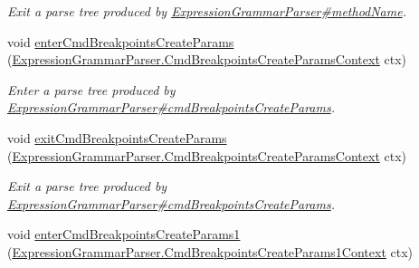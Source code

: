 \begin{DoxyCompactItemize}
\begin{DoxyCompactList}\small\item\em Exit a parse tree produced by \hyperlink{classgov_1_1nasa_1_1jpf_1_1inspector_1_1server_1_1expression_1_1parser_1_1_expression_grammar_parser_aac9184fdab918306e0886559ac17f396}{Expression\+Grammar\+Parser\#method\+Name}. \end{DoxyCompactList}\item 
void \hyperlink{interfacegov_1_1nasa_1_1jpf_1_1inspector_1_1server_1_1expression_1_1parser_1_1_expression_grammar_listener_af0819774bf9d85a4a9869358c0338e2b}{enter\+Cmd\+Breakpoints\+Create\+Params} (\hyperlink{classgov_1_1nasa_1_1jpf_1_1inspector_1_1server_1_1expression_1_1parser_1_1_expression_grammar_pa40092569cc5b197b7a5caae27da04e05}{Expression\+Grammar\+Parser.\+Cmd\+Breakpoints\+Create\+Params\+Context} ctx)
\begin{DoxyCompactList}\small\item\em Enter a parse tree produced by \hyperlink{classgov_1_1nasa_1_1jpf_1_1inspector_1_1server_1_1expression_1_1parser_1_1_expression_grammar_parser_af2721b9a2421fbe474ff8614c667be8b}{Expression\+Grammar\+Parser\#cmd\+Breakpoints\+Create\+Params}. \end{DoxyCompactList}\item 
void \hyperlink{interfacegov_1_1nasa_1_1jpf_1_1inspector_1_1server_1_1expression_1_1parser_1_1_expression_grammar_listener_a7be1a4c2082390a9ef15311b8e52bbc3}{exit\+Cmd\+Breakpoints\+Create\+Params} (\hyperlink{classgov_1_1nasa_1_1jpf_1_1inspector_1_1server_1_1expression_1_1parser_1_1_expression_grammar_pa40092569cc5b197b7a5caae27da04e05}{Expression\+Grammar\+Parser.\+Cmd\+Breakpoints\+Create\+Params\+Context} ctx)
\begin{DoxyCompactList}\small\item\em Exit a parse tree produced by \hyperlink{classgov_1_1nasa_1_1jpf_1_1inspector_1_1server_1_1expression_1_1parser_1_1_expression_grammar_parser_af2721b9a2421fbe474ff8614c667be8b}{Expression\+Grammar\+Parser\#cmd\+Breakpoints\+Create\+Params}. \end{DoxyCompactList}\item 
void \hyperlink{interfacegov_1_1nasa_1_1jpf_1_1inspector_1_1server_1_1expression_1_1parser_1_1_expression_grammar_listener_ad2c8db46a62233137444374796fc39fb}{enter\+Cmd\+Breakpoints\+Create\+Params1} (\hyperlink{classgov_1_1nasa_1_1jpf_1_1inspector_1_1server_1_1expression_1_1parser_1_1_expression_grammar_pa96543943a9acc7eb3cd37320a4fc3ee4}{Expression\+Grammar\+Parser.\+Cmd\+Breakpoints\+Create\+Params1\+Context} ctx)

\end{DoxyCompactItemize}

